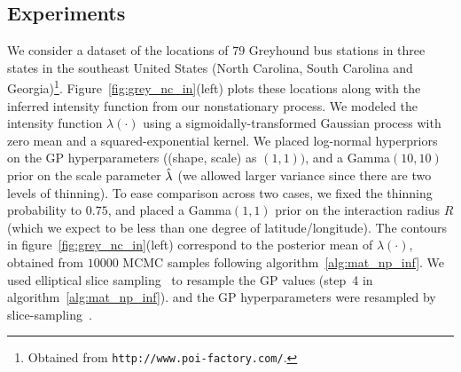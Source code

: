 \documentclass{statsoc}
\begin{document}
  
\subsection{Experiments}

We consider a dataset of the locations of $79$ Greyhound bus stations in three states in the southeast United States (North Carolina, South Carolina and 
Georgia)\footnote{Obtained from \texttt{http://www.poi-factory.com/}.}. Figure~\ref{fig:grey_nc_in}(left) plots these locations along with the inferred intensity function
from our nonstationary \matern process. We modeled the intensity function $\lambda(\cdot)$ using a sigmoidally-transformed Gaussian process 
with zero mean and a squared-exponential kernel. We placed log-normal hyperpriors on the 
 GP hyperparameters ((shape, scale) as $(1,1))$, and a Gamma$(10,10)$ prior on the scale parameter $\hat{\lambda}$ (we allowed larger variance since
 there are two levels of thinning).
 To ease comparison across two cases, we fixed the thinning probability to $0.75$, and placed a Gamma$(1,1)$ prior on the interaction radius $R$ (which
 we expect to be less than one degree of latitude/longitude).
The contours in figure~\ref{fig:grey_nc_in}(left) correspond to the posterior mean of $\lambda(\cdot)$, obtained from $10000$ MCMC samples 
following algorithm~\ref{alg:mat_np_inf}.
 We used elliptical slice sampling~\citep{murray2010} to resample the GP values 
(step~4 %
in algorithm~\ref{alg:mat_np_inf}). and the GP hyperparameters were resampled by slice-sampling~\citep{murray2010b}. 
\end{document}
